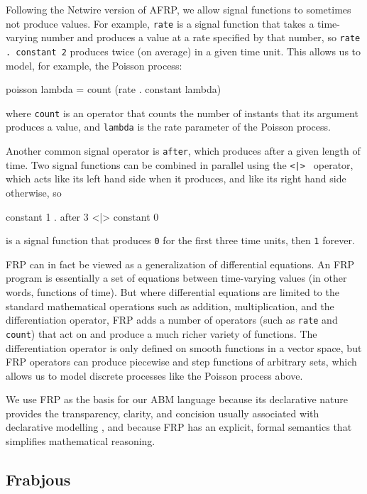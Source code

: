 \documentclass{llncs}
\begin{document}
  Following the Netwire version of AFRP\cite{netwire}, we allow signal functions to sometimes not produce values. For example, \lstinline{rate} is a signal function that takes a time-varying number and produces a value at a rate specified by that number, so \lstinline{rate . constant 2} produces twice (on average) in a given time unit. This allows us to model, for example, the Poisson process: 
\begin{code}
poisson lambda = count (rate . constant lambda)
\end{code}
where \lstinline{count} is an operator that counts the number of instants that its argument produces a value, and \lstinline{lambda} is the rate parameter of the Poisson process. 

  Another common signal operator is \lstinline{after}, which produces after a given length of time. Two signal functions can be combined in parallel using the \lstinline{<|> } operator, which acts like its left hand side when it produces, and like its right hand side otherwise, so 
\begin{code}
constant 1 . after 3 <|> constant 0
\end{code}
is a signal function that produces \lstinline{0} for the first three time units, then \lstinline{1} forever. 
  
    FRP can in fact be viewed as a generalization of differential equations.  An FRP program is essentially a set of equations between time-varying values (in other words, functions of time). But where differential equations are limited to the standard mathematical operations such as addition, multiplication, and the differentiation operator, FRP adds a number of operators (such as \lstinline{rate} and \lstinline{count}) that act on and produce a much richer variety of functions. The differentiation operator is only defined on smooth functions in a vector space, but FRP operators can produce piecewise and step functions of arbitrary sets, which allows us to model discrete processes like the Poisson process above. 
  
  We use FRP as the basis for our ABM language because its declarative nature provides the transparency, clarity, and concision usually associated with declarative modelling \cite{system_dyn_approaches, system_dyn_tradeoffs}, and because FRP has an explicit, formal semantics \cite{fran} that simplifies mathematical reasoning.
  
\subsection{Frabjous}
  
\end{document}

